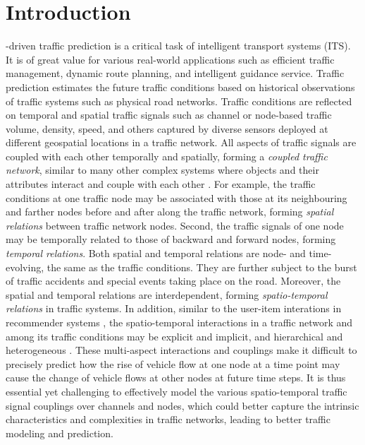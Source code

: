 \section{Introduction}
\label{sec:introduction}

-driven traffic prediction  \cite{vlahogianni2014short} is a critical task of intelligent transport systems (ITS). It is of great value for various real-world applications such as efficient traffic management, dynamic route planning, and intelligent guidance service. Traffic prediction estimates the future traffic conditions based on historical observations of traffic systems such as physical road networks. Traffic conditions are reflected on temporal and spatial traffic signals such as channel or node-based traffic volume, density, speed, and others captured by diverse sensors deployed at different geospatial locations in a traffic network. All aspects of traffic signals are coupled with each other temporally and spatially, forming a \textit{coupled traffic network}, similar to many other complex systems where objects and their attributes interact and couple with each other \cite{2015Coupling,WangGC21}. For example, the traffic conditions at one traffic node may be associated with those at its neighbouring and farther nodes before and after along the traffic network, forming \textit{spatial relations} between traffic network nodes. Second, the traffic signals of one node may be temporally related to those of backward and forward nodes, forming \textit{temporal relations}. Both spatial and temporal relations are node- and time-evolving, the same as the traffic conditions. They are further subject to the burst of traffic accidents and special events taking place on the road. Moreover, the spatial and temporal relations are interdependent, forming \textit{spatio-temporal relations} in traffic systems. In addition, similar to the user-item interations in recommender systems \cite{cao2016non}, the spatio-temporal interactions in a traffic network and among its traffic conditions may be explicit and implicit, and hierarchical and heterogeneous \cite{zhu2020unsupervised}. These multi-aspect interactions and couplings make it difficult to precisely predict how the rise of vehicle flow at one node at a time point may cause the change of vehicle flows at other nodes at future time steps. It is thus essential yet challenging to effectively model the various spatio-temporal traffic signal couplings over channels and nodes, which could better capture the intrinsic characteristics and complexities in traffic networks, leading to better traffic modeling and prediction.

